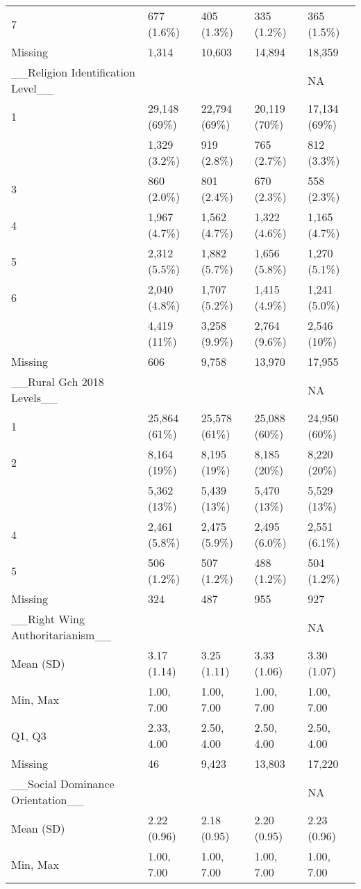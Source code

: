 \documentclass[
  single column]{article}
\begin{document}
\begin{longtable}[t]{lllll}
7 & 677 (1.6\%) & 405 (1.3\%) & 335 (1.2\%) & 365 (1.5\%)\\
Missing & 1,314 & 10,603 & 14,894 & 18,359\\
\_\_Religion Identification Level\_\_ &   ~~&   ~~&   ~~& NA\\
1 & 29,148 (69\%) & 22,794 (69\%) & 20,119 (70\%) & 17,134 (69\%)\\
\addlinespace
2 & 1,329 (3.2\%) & 919 (2.8\%) & 765 (2.7\%) & 812 (3.3\%)\\
3 & 860 (2.0\%) & 801 (2.4\%) & 670 (2.3\%) & 558 (2.3\%)\\
4 & 1,967 (4.7\%) & 1,562 (4.7\%) & 1,322 (4.6\%) & 1,165 (4.7\%)\\
5 & 2,312 (5.5\%) & 1,882 (5.7\%) & 1,656 (5.8\%) & 1,270 (5.1\%)\\
6 & 2,040 (4.8\%) & 1,707 (5.2\%) & 1,415 (4.9\%) & 1,241 (5.0\%)\\
\addlinespace
7 & 4,419 (11\%) & 3,258 (9.9\%) & 2,764 (9.6\%) & 2,546 (10\%)\\
Missing & 606 & 9,758 & 13,970 & 17,955\\
\_\_Rural Gch 2018 Levels\_\_ &  &   ~~&   ~~& NA\\
1 & 25,864 (61\%) & 25,578 (61\%) & 25,088 (60\%) & 24,950 (60\%)\\
2 & 8,164 (19\%) & 8,195 (19\%) & 8,185 (20\%) & 8,220 (20\%)\\
\addlinespace
3 & 5,362 (13\%) & 5,439 (13\%) & 5,470 (13\%) & 5,529 (13\%)\\
4 & 2,461 (5.8\%) & 2,475 (5.9\%) & 2,495 (6.0\%) & 2,551 (6.1\%)\\
5 & 506 (1.2\%) & 507 (1.2\%) & 488 (1.2\%) & 504 (1.2\%)\\
Missing & 324 & 487 & 955 & 927\\
\_\_Right Wing Authoritarianism\_\_ &   ~~&   ~~&   ~~& NA\\
\addlinespace
Mean (SD) & 3.17 (1.14) & 3.25 (1.11) & 3.33 (1.06) & 3.30 (1.07)\\
Min, Max & 1.00, 7.00 & 1.00, 7.00 & 1.00, 7.00 & 1.00, 7.00\\
Q1, Q3 & 2.33, 4.00 & 2.50, 4.00 & 2.50, 4.00 & 2.50, 4.00\\
Missing & 46 & 9,423 & 13,803 & 17,220\\
\_\_Social Dominance Orientation\_\_ &   ~~&   ~~&   ~~& NA\\
\addlinespace
Mean (SD) & 2.22 (0.96) & 2.18 (0.95) & 2.20 (0.95) & 2.23 (0.96)\\
Min, Max & 1.00, 7.00 & 1.00, 7.00 & 1.00, 7.00 & 1.00, 7.00\\

\end{longtable}
\end{document}

